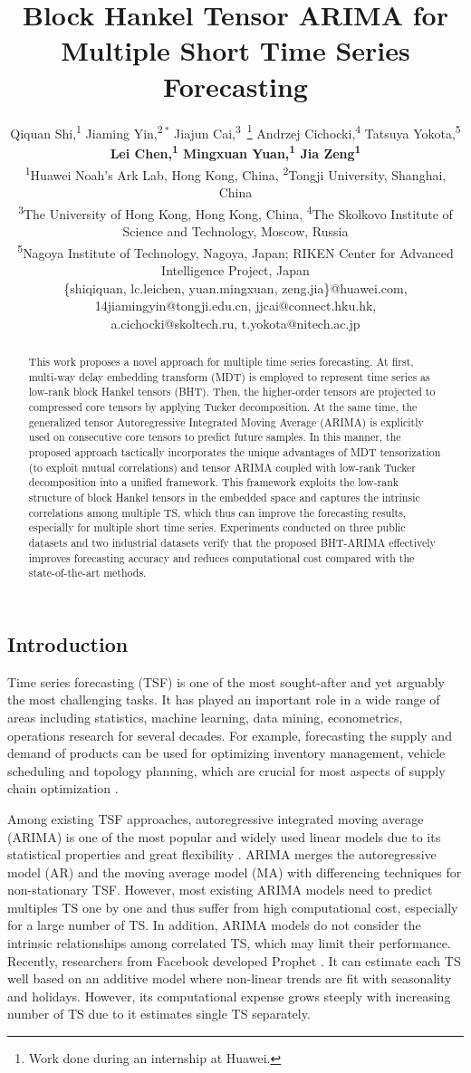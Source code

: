 \documentclass[letterpaper]{article} %
\title{Block Hankel Tensor ARIMA for Multiple Short Time Series Forecasting}
\author{
	Qiquan Shi,\textsuperscript{\rm 1}
	 Jiaming Yin,\textsuperscript{\rm 2}${}^{\ *}$
Jiajun  Cai,\textsuperscript{\rm 3}~\thanks{Work done during an internship at Huawei.}
	Andrzej Cichocki,\textsuperscript{\rm 4}
Tatsuya Yokota,\textsuperscript{\rm 5}\\\Large\textbf{
Lei Chen,\textsuperscript{\rm 1}
Mingxuan Yuan,\textsuperscript{\rm 1}
Jia Zeng\textsuperscript{\rm 1}}
\\
	\textsuperscript{\rm 1}Huawei Noah's Ark Lab, Hong Kong, China,
	\textsuperscript{\rm 2}Tongji University, Shanghai, China\\
\textsuperscript{\rm 3}The University of Hong Kong, Hong Kong, China,
\textsuperscript{\rm 4}The Skolkovo  Institute  of Science and Technology, Moscow, Russia\\
\textsuperscript{\rm 5}Nagoya Institute of Technology, Nagoya, Japan; RIKEN Center for Advanced Intelligence Project, Japan\\
\{shiqiquan, lc.leichen, yuan.mingxuan, zeng.jia\}@huawei.com,
14jiamingyin@tongji.edu.cn,
jjcai@connect.hku.hk,\\
a.cichocki@skoltech.ru,
t.yokota@nitech.ac.jp
}
\numberwithin{theorem}{section}
\begin{document}
\maketitle

\begin{abstract}
This work proposes a novel approach for multiple time series forecasting. At first, multi-way delay embedding transform (MDT)  is employed to represent time series as low-rank block Hankel tensors (BHT). Then,  the higher-order tensors are projected to compressed core tensors by applying  Tucker decomposition. At the same time, the  generalized tensor Autoregressive Integrated Moving Average (ARIMA) is explicitly used on consecutive core tensors to predict future samples.  In this manner, the proposed approach tactically incorporates the unique advantages of MDT tensorization (to exploit mutual correlations) and tensor ARIMA coupled with low-rank Tucker decomposition into a unified framework.  This framework exploits the  low-rank structure of block Hankel tensors in the embedded space and captures the intrinsic correlations among multiple TS, which thus can improve the forecasting results, especially for multiple short time series.  Experiments conducted on three public  datasets and two industrial datasets verify that the proposed BHT-ARIMA effectively improves forecasting accuracy and reduces computational cost compared with the state-of-the-art methods.


\end{abstract}


\subsection{Introduction}
Time series forecasting (TSF)  is one of the most sought-after and yet arguably the most challenging tasks. 	It  has played an important  role in a wide range of areas including statistics, machine learning, data mining,  econometrics, operations research for several decades.
	For example, forecasting the supply and demand of products can be used for  optimizing inventory management, vehicle scheduling and topology planning, which are    crucial for most aspects of supply chain optimization \cite{faloutsos2019forecasting}.

	Among existing TSF approaches, autoregressive integrated moving average (ARIMA) \cite{box1968some} is one of the most popular and widely used  linear  models due to its  statistical properties and great flexibility \cite{liu2016online}.  ARIMA  merges       the autoregressive model (AR) and the moving average model (MA)   with  differencing techniques for non-stationary TSF.   However, most existing ARIMA models need to predict multiples TS one by one and thus suffer from high computational cost, especially for a large number of TS.  In addition,   ARIMA models  do not consider  the intrinsic relationships among   correlated TS, which may limit their performance.  Recently, researchers from
	Facebook developed   Prophet \cite{taylor2018forecasting}.  It  can   estimate  each  TS  well based on an additive model where non-linear trends are fit with seasonality and holidays.
	However, its computational expense grows steeply with increasing number of TS due to it estimates  single TS separately.
\end{document}
